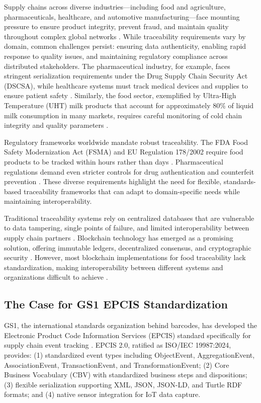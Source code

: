 \documentclass[preprint,review,12pt,authoryear]{elsarticle}
\begin{document}
Supply chains across diverse industries---including food and agriculture, pharmaceuticals, healthcare, and automotive manufacturing---face mounting pressure to ensure product integrity, prevent fraud, and maintain quality throughout complex global networks \cite{bolton2020don}. While traceability requirements vary by domain, common challenges persist: ensuring data authenticity, enabling rapid response to quality issues, and maintaining regulatory compliance across distributed stakeholders. The pharmaceutical industry, for example, faces stringent serialization requirements under the Drug Supply Chain Security Act (DSCSA), while healthcare systems must track medical devices and supplies to ensure patient safety \cite{schapranow2020ontology}. Similarly, the food sector, exemplified by Ultra-High Temperature (UHT) milk products that account for approximately 80\% of liquid milk consumption in many markets, requires careful monitoring of cold chain integrity and quality parameters \cite{perkins2010dynamic}.

Regulatory frameworks worldwide mandate robust traceability. The FDA Food Safety Modernization Act (FSMA) and EU Regulation 178/2002 require food products to be tracked within hours rather than days \cite{fsma2011,eu2002general}. Pharmaceutical regulations demand even stricter controls for drug authentication and counterfeit prevention \cite{schapranow2020ontology}. These diverse requirements highlight the need for flexible, standards-based traceability frameworks that can adapt to domain-specific needs while maintaining interoperability.

Traditional traceability systems rely on centralized databases that are vulnerable to data tampering, single points of failure, and limited interoperability between supply chain partners \cite{tian2016supply}. Blockchain technology has emerged as a promising solution, offering immutable ledgers, decentralized consensus, and cryptographic security \cite{zheng2018blockchain}. However, most blockchain implementations for food traceability lack standardization, making interoperability between different systems and organizations difficult to achieve \cite{salah2019blockchain}.

\subsection{The Case for GS1 EPCIS Standardization}

GS1, the international standards organization behind barcodes, has developed the Electronic Product Code Information Services (EPCIS) standard specifically for supply chain event tracking \cite{gs1epcis2021}. EPCIS 2.0, ratified as ISO/IEC 19987:2024, provides: (1) standardized event types including ObjectEvent, AggregationEvent, AssociationEvent, TransactionEvent, and TransformationEvent; (2) Core Business Vocabulary (CBV) with standardized business steps and dispositions; (3) flexible serialization supporting XML, JSON, JSON-LD, and Turtle RDF formats; and (4) native sensor integration for IoT data capture.
\end{document}
